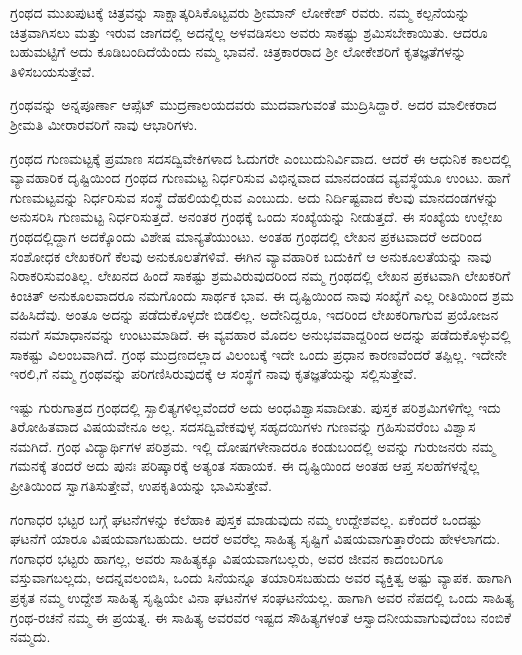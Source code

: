 {ಗ್ರಂಥದ ಮುಖಪುಟಕ್ಕೆ ಚಿತ್ರವನ್ನು ಸಾಕ್ಷಾತ್ಕರಿಸಿಕೊಟ್ಟವರು ಶ್ರೀಮಾನ್ \hbox{ಲೋಕೇಶ್} ರವರು. ನಮ್ಮ ಕಲ್ಪನೆಯನ್ನು ಚಿತ್ರವಾಗಿಸಲು ಮತ್ತು ಇರುವ ಜಾಗದಲ್ಲಿ ಅದನ್ನೆಲ್ಲ ಅಳವಡಿಸಲು ಅವರು ಸಾಕಷ್ಟು ಶ್ರಮಿಸಬೇಕಾಯಿತು. ಆದರೂ ಬಹುಮಟ್ಟಿಗೆ ಅದು ಕೂಡಿಬಂದಿದೆಯೆಂದು ನಮ್ಮ ಭಾವನೆ. ಚಿತ್ರಕಾರರಾದ ಶ್ರೀ ಲೋಕೇಶರಿಗೆ ಕೃತಜ್ಞತೆಗಳನ್ನು ತಿಳಿಸಬಯಸುತ್ತೇವೆ.

ಗ್ರಂಥವನ್ನು ಅನ್ನಪೂರ್ಣಾ ಆಪ್ಸೆಟ್  ಮುದ್ರಣಾಲಯದವರು ಮುದ\-ವಾಗುವಂತೆ ಮುದ್ರಿಸಿದ್ದಾರೆ. ಅದರ  ಮಾಲೀಕರಾದ ಶ್ರೀಮತಿ ಮೀರಾರವರಿಗೆ ನಾವು ಆಭಾರಿಗಳು.
\vskip 4pt

ಗ್ರಂಥದ ಗುಣಮಟ್ಟಕ್ಕೆ ಪ್ರಮಾಣ ಸದಸದ್ವಿವೇಕಿಗಳಾದ ಓದುಗರೇ ಎಂಬುದು\break ನಿರ್ವಿವಾದ. ಆದರೆ ಈ ಆಧುನಿಕ ಕಾಲದಲ್ಲಿ ವ್ಯಾವಹಾರಿಕ ದೃಷ್ಟಿಯಿಂದ ಗ್ರಂಥದ \hbox{ಗುಣಮಟ್ಟ} ನಿರ್ಧರಿಸುವ ವಿಭಿನ್ನವಾದ ಮಾನದಂಡದ ವ್ಯವಸ್ಥೆಯೂ ಉಂಟು. ಹಾಗೆ ಗುಣಮಟ್ಟವನ್ನು ನಿರ್ಧರಿಸುವ ಸಂಸ್ಥೆ ದೆಹಲಿಯಲ್ಲಿರುವ ಎಂಬುದು. ಅದು ನಿರ್ದಿಷ್ಟವಾದ ಕೆಲವು ಮಾನ\-ದಂಡಗಳನ್ನು ಅನುಸರಿಸಿ ಗುಣಮಟ್ಟ ನಿರ್ಧರಿಸುತ್ತದೆ. ಅನಂತರ ಗ್ರಂಥಕ್ಕೆ ಒಂದು ಸಂಖ್ಯೆಯನ್ನು ನೀಡುತ್ತದೆ. ಈ ಸಂಖ್ಯೆಯ ಉಲ್ಲೇಖ ಗ್ರಂಥದಲ್ಲಿದ್ದಾಗ ಅದಕ್ಕೊಂದು ವಿಶೇಷ ಮಾನ್ಯತೆಯುಂಟು. ಅಂತಹ ಗ್ರಂಥದಲ್ಲಿ ಲೇಖನ ಪ್ರಕಟವಾದರೆ ಅದರಿಂದ ಸಂಶೋಧಕ ಲೇಖಕರಿಗೆ ಕೆಲವು ಅನುಕೂಲತೆ\-ಗಳಿವೆ. ಈಗಿನ ವ್ಯಾವಹಾರಿಕ ಬದುಕಿಗೆ ಆ ಅನುಕೂಲತೆಯನ್ನು ನಾವು ನಿರಾಕರಿಸುವಂತಿಲ್ಲ. ಲೇಖನದ ಹಿಂದೆ ಸಾಕಷ್ಟು ಶ್ರಮವಿರುವುದರಿಂದ ನಮ್ಮ ಗ್ರಂಥದಲ್ಲಿ ಲೇಖನ ಪ್ರಕಟವಾಗಿ ಲೇಖಕರಿಗೆ  ಕಿಂಚಿತ್ ಅನುಕೂಲ\-ವಾದರೂ ನಮಗೊಂದು ಸಾರ್ಥಕ ಭಾವ. ಈ ದೃಷ್ಟಿಯಿಂದ ನಾವು  ಸಂಖ್ಯೆಗೆ ಎಲ್ಲ ರೀತಿಯಿಂದ ಶ್ರಮ ವಹಿಸಿದೆವು. ಅಂತೂ ಅದನ್ನು ಪಡೆದುಕೊಳ್ಳದೇ ಬಿಡಲಿಲ್ಲ. ಅದೇನಿದ್ದರೂ, ಇದರಿಂದ ಲೇಖಕ\-ರಿಗಾಗುವ ಪ್ರಯೋಜನ ನಮಗೆ ಸಮಾಧಾನವನ್ನು ಉಂಟುಮಾಡಿದೆ. ಈ ವ್ಯವಹಾರ ಮೊದಲ ಅನುಭವವಾದ್ದರಿಂದ ಅದನ್ನು ಪಡೆದು\-ಕೊಳ್ಳುವಲ್ಲಿ ಸಾಕಷ್ಟು ವಿಲಂಬವಾಗಿದೆ. ಗ್ರಂಥ ಮುದ್ರಣದಲ್ಲಾದ ವಿಲಂಬಕ್ಕೆ  ಇದೇ ಒಂದು ಪ್ರಧಾನ ಕಾರಣವೆಂದರೆ ತಪ್ಪಿಲ್ಲ. ಇದೇನೇ ಇರಲಿ,ಗೆ ನಮ್ಮ ಗ್ರಂಥವನ್ನು ಪರಿಗಣಿಸಿರುವುದಕ್ಕೆ ಆ ಸಂಸ್ಥೆಗೆ ನಾವು ಕೃತಜ್ಞತೆಯನ್ನು ಸಲ್ಲಿಸುತ್ತೇವೆ.
\vskip 4pt

ಇಷ್ಟು ಗುರುಗಾತ್ರದ ಗ್ರಂಥದಲ್ಲಿ ಸ್ಖಾಲಿತ್ಯಗಳಿಲ್ಲವೆಂದರೆ ಅದು ಅಂಧ\break ವಿಶ್ವಾಸವಾದೀತು. ಪುಸ್ತಕ ಪರಿಶ್ರಮಿಗಳಿಗೆಲ್ಲ ಇದು ತಿರೋಹಿತವಾದ \hbox{ವಿಷಯವೇನೂ} ಅಲ್ಲ. ಸದಸದ್ವಿವೇಕವುಳ್ಳ ಸಹೃದಯಿಗಳು ಗುಣವನ್ನು ಗ್ರಹಿಸುವರೆಂಬ ವಿಶ್ವಾಸ \hbox{ನಮಗಿದೆ}. ಗ್ರಂಥ ವಿದ್ಯಾರ್ಥಿಗಳ ಪರಿಶ್ರಮ. ಇಲ್ಲಿ ದೋಷಗಳೇನಾದರೂ ಕಂಡುಬಂದಲ್ಲಿ \hbox{ಅವನ್ನು} ಗುರುಜನರು ನಮ್ಮ ಗಮನಕ್ಕೆ ತಂದರೆ ಅದು ಪುನಃ ಪರಿಷ್ಕಾರಕ್ಕೆ ಅತ್ಯಂತ ಸಹಾಯಕ. ಈ ದೃಷ್ಟಿಯಿಂದ ಅಂತಹ ಆಪ್ತ ಸಲಹೆಗಳನ್ನೆಲ್ಲ ಪ್ರೀತಿಯಿಂದ ಸ್ವಾಗತಿಸುತ್ತೇವೆ, \hbox{ಉಪಕೃತಿಯನ್ನು}  ಭಾವಿಸುತ್ತೇವೆ.

ಗಂಗಾಧರ ಭಟ್ಟರ ಬಗ್ಗೆ ಘಟನೆಗಳನ್ನು ಕಲೆಹಾಕಿ ಪುಸ್ತಕ ಮಾಡುವುದು ನಮ್ಮ ಉದ್ದೇಶವಲ್ಲ. ಏಕೆಂದರೆ ಒಂದಷ್ಟು ಘಟನೆಗೆ ಯಾರೂ ವಿಷಯವಾಗಬಹುದು. ಆದರೆ ಅವರೆಲ್ಲ ಸಾಹಿತ್ಯ ಸೃಷ್ಟಿಗೆ ವಿಷಯವಾಗುತ್ತಾರೆಂದು ಹೇಳಲಾಗದು. ಗಂಗಾಧರ ಭಟ್ಟರು ಹಾಗಲ್ಲ, ಅವರು ಸಾಹಿತ್ಯಕ್ಕೂ ವಿಷಯವಾಗಬಲ್ಲರು, ಅವರ ಜೀವನ \hbox{ಕಾದಂಬರಿಗೂ} ವಸ್ತುವಾಗಬಲ್ಲದು, ಅದನ್ನವಲಂಬಿಸಿ, ಒಂದು ಸಿನೆಯನ್ನೂ ತಯಾರಿಸಬಹುದು \enginline{-} ಅವರ ವ್ಯಕ್ತಿತ್ವ ಅಷ್ಟು ವ್ಯಾಪಕ. ಹಾಗಾಗಿ ಪ್ರಕೃತ ನಮ್ಮ ಉದ್ದೇಶ \enginline{-} ಸಾಹಿತ್ಯ \hbox{ಸೃಷ್ಟಿಯೇ} ವಿನಾ ಘಟನೆಗಳ ಸಂಘಟನೆಯಲ್ಲ. ಹಾಗಾಗಿ ಅವರ ನೆಪದಲ್ಲಿ ಒಂದು ಸಾಹಿತ್ಯ \enginline{-} ಗ್ರಂಥ-ರಚನೆ ನಮ್ಮ ಈ ಪ್ರಯತ್ನ. ಈ ಸಾಹಿತ್ಯ ಅವರವರ ಇಷ್ಟದ \hbox{ಸೌಹಿತ್ಯಗಳಂತೆ} ಆಸ್ವಾದನೀಯವಾಗುವುದೆಂಬ ನಂಬಿಕೆ ನಮ್ಮದು.

}
